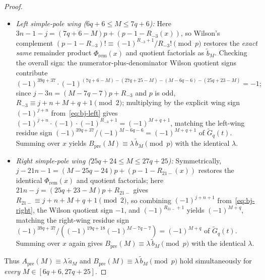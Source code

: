 \documentclass[11pt,reqno]{amsart}
\theoremstyle{definition}
\theoremstyle{remark}
\begin{document}
\begin{proof}
\begin{itemize}
  \[
    \frac{1}{(M-7q-7)!\,(27q+25-M)!\,(M-6q-6)!\,(25q+23-M)!}
  \]
  with Wilson sign $(-1)^{-(20q+18)-(19q+17)} = (-1)^{39q+35}$, cancelling the numerator sign to $+1$ (matching $\widetilde{a}_M$, whose sign is $(-1)^{39q+37}/(-1)^{2M-13q-13} = +1$). Hence $C_n a_j/p^{v+1} \equiv C_{\mathrm{top}}\,\widetilde{a}_M\,\Phi_{\mathrm{rem}}(x) \pmod p$, and summing over $0 \le x < x_{\mathrm{split}}$ gives $A_{\mathrm{pre}}(M) \equiv \lambda\,\widetilde{a}_M \pmod p$. Furthermore, since $p H_{Qp+R} \equiv H_Q \pmod p$, $-p L_j$ reduces modulo $p$ to the exact logarithmic derivative $\widetilde{b}_M/\widetilde{a}_M$ of $(t+M)^2\widetilde{G}_q(t)$ at $t = -M$ (independent of $x$), yielding $B_{\mathrm{pre}}(M) \equiv \lambda\,\widetilde{b}_M \pmod p$.
  \item \emph{Left simple-pole wing ($6q + 6 \le M \le 7q + 6$):} Here $3n - 1 - j = (7q + 6 - M)p + (p - 1 - R_{-3}(x))$, so Wilson's complement $(p - 1 - R_{-3})! \equiv (-1)^{R_{-3}+1}/R_{-3}! \pmod p$ restores the \emph{exact same} remainder product $\Phi_{\mathrm{rem}}(x)$ and quotient factorials as $\widetilde{b}_M$. Checking the overall sign: the numerator-plus-denominator Wilson quotient signs contribute
  \[
    (-1)^{39q+37}\cdot(-1)^{(7q+6-M)-(27q+25-M)-(M-6q-6)-(25q+23-M)} = -1;
  \]
  since $j - 3n = (M - 7q - 7)p + R_{-3}$ and $p$ is odd, $R_{-3} \equiv j + n + M + q + 1 \pmod 2$; multiplying by the explicit wing sign $(-1)^{j+n}$ from~\eqref{eq:bj-left} gives $(-1)^{j+n}\cdot(-1)\cdot(-1)^{R_{-3}+1} = (-1)^{M+q+1}$, matching the left-wing residue sign $(-1)^{39q+37}/(-1)^{M-6q-6} = (-1)^{M+q+1}$ of $\widetilde{G}_q(t)$. Summing over $x$ yields $B_{\mathrm{pre}}(M) \equiv \lambda\,\widetilde{b}_M \pmod p$ with the identical $\lambda$.
  \item \emph{Right simple-pole wing ($25q + 24 \le M \le 27q + 25$):} Symmetrically, $j - 21n - 1 = (M - 25q - 24)p + (p - 1 - R_{21-}(x))$ restores the identical $\Phi_{\mathrm{rem}}(x)$ and quotient factorials; here $21n - j = (25q + 23 - M)p + R_{21-}$ gives $R_{21-} \equiv j + n + M + q + 1 \pmod 2$, so combining $(-1)^{j+n+1}$ from~\eqref{eq:bj-right}, the Wilson quotient sign $-1$, and $(-1)^{R_{21-}+1}$ yields $(-1)^{M+q}$, matching the right-wing residue sign $(-1)^{39q+37}/((-1)^{19q+18}(-1)^{M-7q-7}) = (-1)^{M+q}$ of $\widetilde{G}_q(t)$. Summing over $x$ again gives $B_{\mathrm{pre}}(M) \equiv \lambda\,\widetilde{b}_M \pmod p$ with the identical $\lambda$.
\end{itemize}
Thus $A_{\mathrm{pre}}(M) \equiv \lambda\,\widetilde{a}_M$ and $B_{\mathrm{pre}}(M) \equiv \lambda\,\widetilde{b}_M \pmod p$ hold simultaneously for \emph{every} $M \in [6q+6, 27q+25]$.


\end{proof}
\end{document}

